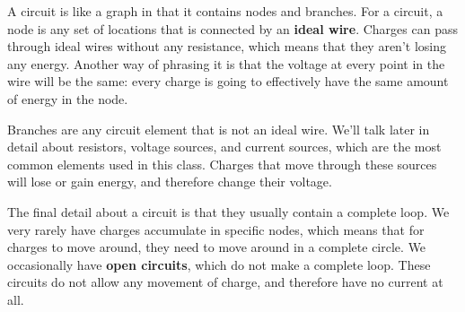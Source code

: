 A circuit is like a graph in that it contains nodes and branches.  For a circuit, a node is any set of locations that is connected by an {\bf ideal wire}.
Charges can pass through ideal wires without any resistance, which means that they aren't losing any energy.  Another way of phrasing it is that the voltage at every point in the wire will be the same: every charge is going to effectively have the same amount of energy in the node.

Branches are any circuit element that is not an ideal wire.  We'll talk later in detail about resistors, voltage sources, and current sources, which are the most common elements used in this class.  Charges that move through these sources will lose or gain energy, and therefore change their voltage.

The final detail about a circuit is that they usually contain a complete loop.  We very rarely have charges accumulate in specific nodes, which means that for charges to move around, they need to move around in a complete circle.  We occasionally have {\bf open circuits}, which do not make a complete loop.  These circuits do not allow any movement of charge, and therefore have no current at all.
